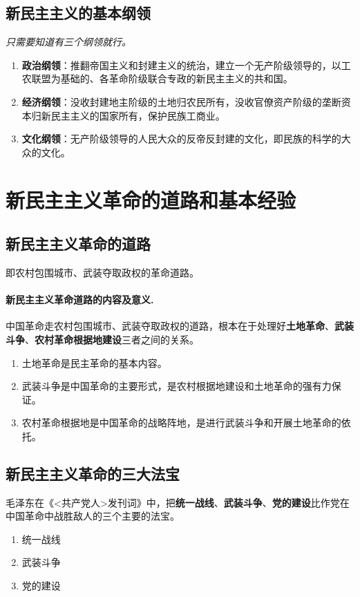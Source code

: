     \subsection{新民主主义的基本纲领}
    \emph{只需要知道有三个纲领就行。}
    \begin{enumerate}
        \item \textbf{政治纲领}：推翻帝国主义和封建主义的统治，建立一个无产阶级领导的，以工农联盟为基础的、各革命阶级联合专政的新民主主义的共和国。
        \item \textbf{经济纲领}：没收封建地主阶级的土地归农民所有，没收官僚资产阶级的垄断资本归新民主主义的国家所有，保护民族工商业。
        \item \textbf{文化纲领}：无产阶级领导的人民大众的反帝反封建的文化，即民族的科学的大众的文化。
    \end{enumerate}


\section{新民主主义革命的道路和基本经验}

    \subsection{新民主主义革命的道路}
    即农村包围城市、武装夺取政权的革命道路。
    \paragraph{新民主主义革命道路的内容及意义.} 中国革命走农村包围城市、武装夺取政权的道路，根本在于处理好\textbf{土地革命}、\textbf{武装斗争}、\textbf{农村革命根据地建设}三者之间的关系。
    \begin{enumerate}
        \item 土地革命是民主革命的基本内容。
        \item 武装斗争是中国革命的主要形式，是农村根据地建设和土地革命的强有力保证。
        \item 农村革命根据地是中国革命的战略阵地，是进行武装斗争和开展土地革命的依托。
    \end{enumerate}

    \subsection{新民主主义革命的三大法宝}
    毛泽东在《<共产党人>发刊词》中，把\textbf{统一战线}、\textbf{武装斗争}、\textbf{党的建设}比作党在中国革命中战胜敌人的三个主要的法宝。
    \begin{enumerate}
        \item 统一战线
        \item 武装斗争
        \item 党的建设
    \end{enumerate}